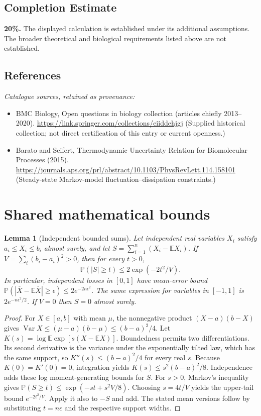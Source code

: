 \documentclass[11pt]{article}
\newcommand{\E}{\mathbb E}
\newcommand{\Prob}{\mathbb P}
\DeclareMathOperator{\Var}{Var}
\providecommand{\E}{\mathbb E}
\providecommand{\Prob}{\mathbb P}
\providecommand{\Var}{\operatorname{Var}}
\newtheorem{sharedlemma}{Lemma}[section]
\begin{document}
\subsection{Completion Estimate}
\textbf{20\%.} The displayed calculation is established under its additional assumptions. The broader theoretical and biological requirements listed above are not established.
\subsection{References}
\noindent\emph{Catalogue sources, retained as provenance:}
\begin{itemize}
\item BMC Biology, Open questions in biology collection (articles chiefly 2013--2020). \url{https://link.springer.com/collections/eiiddehjgj} (Supplied historical collection; not direct certification of this entry or current openness.)
\item Barato and Seifert, Thermodynamic Uncertainty Relation for Biomolecular Processes (2015). \url{https://journals.aps.org/prl/abstract/10.1103/PhysRevLett.114.158101} (Steady-state Markov-model fluctuation--dissipation constraints.)
\end{itemize}
\clearpage


\appendix
\section{Shared mathematical bounds}\label{app:bounds}
\begin{sharedlemma}[Independent bounded sums]\label{lem:bounded}
Let independent real variables $X_i$ satisfy $a_i\leq X_i\leq b_i$ almost surely,
and let $S=\sum_{i=1}^n(X_i-\E X_i)$. If
$V=\sum_i(b_i-a_i)^2>0$, then for every $t>0$,
\[
 \Prob(|S|\geq t)\leq 2\exp(-2t^2/V).
\]
In particular, independent losses in $[0,1]$ have mean-error bound
$\Prob(|\overline X-\E\overline X|\geq\epsilon)
\leq2e^{-2n\epsilon^2}$. The same expression for variables in $[-1,1]$
is $2e^{-n\epsilon^2/2}$. If $V=0$ then $S=0$ almost surely.
\end{sharedlemma}
\begin{proof}
For $X\in[a,b]$ with mean $\mu$, the nonnegative product
$(X-a)(b-X)$ gives
$\Var X\leq(\mu-a)(b-\mu)\leq(b-a)^2/4$.
Let $K(s)=\log\E\exp[s(X-\E X)]$.
Boundedness permits two differentiations. Its second derivative is the variance
under the exponentially tilted law, which has the same support, so
$K''(s)\leq(b-a)^2/4$ for every real $s$.
Because $K(0)=K'(0)=0$, integration yields
$K(s)\leq s^2(b-a)^2/8$.
Independence adds these log moment-generating bounds for $S$.
For $s>0$, Markov's inequality gives
$\Prob(S\geq t)\leq\exp(-st+s^2V/8)$.
Choosing $s=4t/V$ yields the upper-tail bound $e^{-2t^2/V}$.
Apply it also to $-S$ and add. The stated mean versions follow by substituting
$t=n\epsilon$ and the respective support widths.
\end{proof}
\end{document}
